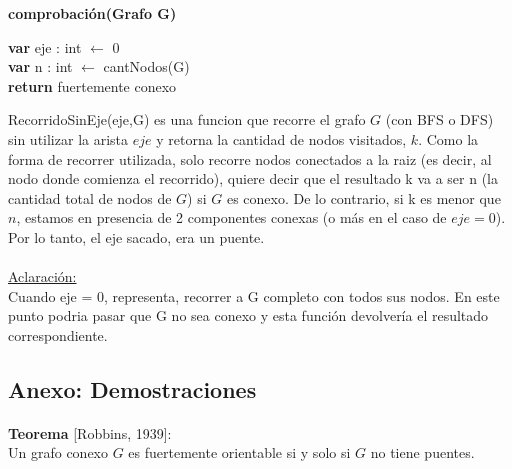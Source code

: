 \vspace*{3cm}

\incmargin{1em}
\linesnumbered
{}

\textbf{comprobación(Grafo G)}\\
	\begin{algorithm}[H]

    \textbf{var} eje : int $\leftarrow$ 0 \\
    \textbf{var} n : int $\leftarrow$ cantNodos(G) \\
				


      \textbf{return} fuertemente conexo

  \end{algorithm}

RecorridoSinEje(eje,G) es una funcion que recorre el grafo $G$  (con BFS o DFS) sin utilizar la arista $eje$ y retorna la cantidad de nodos visitados, $k$. Como la forma de recorrer utilizada, solo recorre nodos conectados a la raiz (es decir, al nodo donde comienza el recorrido), quiere decir que el resultado k va a ser n (la cantidad total de nodos de $G$) si $G$ es conexo. De lo contrario, si k es menor que $n$, estamos en presencia de 2 componentes conexas (o más en el caso de $eje = 0$). Por lo tanto, el eje sacado, era un puente. 

\paragraph{}
\underline{Aclaración: }
\\
Cuando eje = 0, representa, recorrer a G completo con todos sus nodos. En este punto podria pasar que G no sea conexo y esta función devolvería el resultado correspondiente.


\subsection{Anexo: Demostraciones}
\label{demostraciones2}


\paragraph{}
\textbf{Teorema} [Robbins, 1939]:\\
Un grafo conexo $G$ es fuertemente orientable si y solo si $G$ no tiene puentes.


